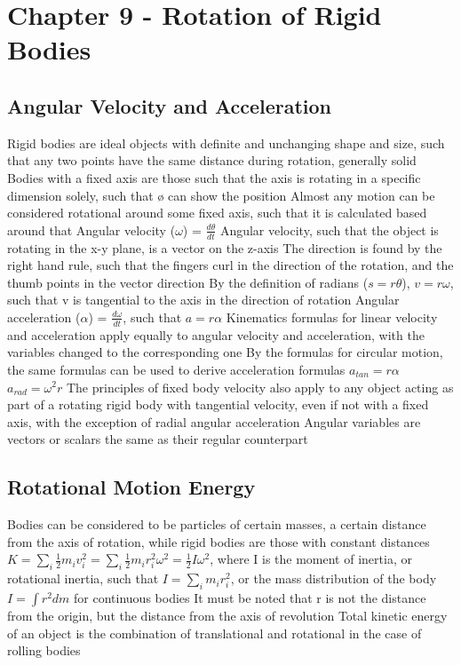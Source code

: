 \documentclass[11 pt, twoside]{article}
\newenvironment{outline*}
{
	\begin{outline}[enumerate]
	}
	{\end{outline}
}
\begin{document}
\section{Chapter 9 - Rotation of Rigid Bodies}
\subsection{Angular Velocity and Acceleration}
\begin{outline*}
\1 Rigid bodies are ideal objects with definite and unchanging shape and size, such that any two points have the same distance during rotation, generally solid
\1 Bodies with a fixed axis are those such that the axis is rotating in a specific dimension solely, such that ø can show the position
\2 Almost any motion can be considered rotational around some fixed axis, such that it is calculated based around that
\1 Angular velocity ($\omega$) = $\frac{d\theta}{dt}$
\2 Angular velocity, such that the object is rotating in the x-y plane, is a vector on the z-axis
\2 The direction is found by the right hand rule, such that the fingers curl in the direction of the rotation, and the thumb points in the vector direction
\2 By the definition of radians ($s = r\theta$), $v = r\omega$, such that v is tangential to the axis in the direction of rotation
\1 Angular acceleration ($\alpha$) = $\frac{d\omega}{dt}$, such that $a = r\alpha$
\1 Kinematics formulas for linear velocity and acceleration apply equally to angular velocity and acceleration, with the variables changed to the corresponding one
\2 By the formulas for circular motion, the same formulas can be used to derive acceleration formulas
\2 $a_{tan} = r\alpha$
\2 $a_{rad} = \omega^2r$
\1 The principles of fixed body velocity also apply to any object acting as part of a rotating rigid body with tangential velocity, even if not with a fixed axis, with the exception of radial angular acceleration
\1 Angular variables are vectors or scalars the same as their regular counterpart 
\end{outline*}
\subsection{Rotational Motion Energy}
\begin{outline*}
\1 Bodies can be considered to be particles of certain masses, a certain distance from the axis of rotation, while rigid bodies are those with constant distances
\1 $K = \sum_i \frac{1}{2}m_iv_i^2 = \sum_i \frac{1}{2}m_ir_i^2\omega^2 = \frac{1}{2}I\omega^2$, where I is the moment of inertia, or rotational inertia, such that $I = \sum_i m_ir_i^2$, or the mass distribution of the body
\1 $I = \int r^2dm$ for continuous bodies
\2 It must be noted that r is not the distance from the origin, but the distance from the axis of revolution
\1 Total kinetic energy of an object is the combination of translational and rotational in the case of rolling bodies
\end{outline*}
\end{document}
